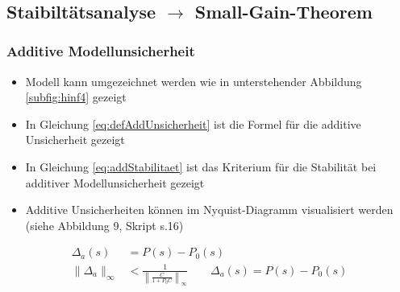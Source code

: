 \begin{figure}[!ht]
	\centering
	\\
	\label{fig:hinf2}
\end{figure}

\subsection{Staibiltätsanalyse $\rightarrow$ Small-Gain-Theorem}
\subsubsection{Additive Modellunsicherheit}
\begin{itemize}
	\item Modell kann umgezeichnet werden wie in unterstehender Abbildung \ref{subfig:hinf4} gezeigt
	\item In Gleichung \ref{eq:defAddUnsicherheit} ist die Formel für die additive Unsicherheit gezeigt
	\item In Gleichung \ref{eq:addStabilitaet} ist das Kriterium für die Stabilität bei additiver Modellunsicherheit gezeigt
	\item Additive Unsicherheiten können im Nyquist-Diagramm visualisiert werden (siehe Abbildung 9, Skript s.16)
\end{itemize}
\begin{align}
	\label{eq:defAddUnsicherheit}
	\Delta_a(s) &= P(s)-P_0(s)\\
	\label{eq:addStabilitaet}
	\lVert\Delta_a\rVert_\infty &< \frac{1}{\left\lVert\frac{C}{1+P_0C}\right\rVert_\infty} \qquad \Delta_a(s) = P(s)-P_0(s)
\end{align}

